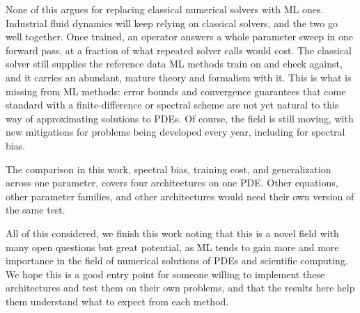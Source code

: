 None of this argues for replacing classical numerical solvers with ML ones. Industrial fluid dynamics will keep relying on classical solvers, and the two go well together. Once trained, an operator answers a whole parameter sweep in one forward pass, at a fraction of what repeated solver calls would cost. The classical solver still supplies the reference data ML methods train on and check against, and it carries an abundant, mature theory and formalism with it. This is what is missing from ML methods: error bounds and convergence guarantees that come standard with a finite-difference or spectral scheme are not yet natural to this way of approximating solutions to PDEs. Of course, the field is still moving, with new mitigations for problems being developed every year, including for spectral bias.

The comparison in this work, spectral bias, training cost, and generalization across one parameter, covers four architectures on one PDE. Other equations, other parameter families, and other architectures would need their own version of the same test.

All of this considered, we finish this work noting that this is a novel field with many open questions but great potential, as ML tends to gain more and more importance in the field of numerical solutions of PDEs and scientific computing. We hope this is a good entry point for someone willing to implement these architectures and test them on their own problems, and that the results here help them understand what to expect from each method.